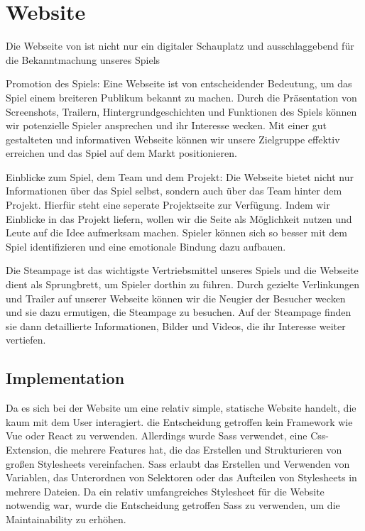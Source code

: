 
\section{Website}\label{sec:website}

\renewcommand{\kapitelautor}{Autor: Nils \& Marvin} %

%
Die Webseite von \ff ist nicht nur ein digitaler Schauplatz und ausschlaggebend für die Bekanntmachung unseres Spiels

Promotion des Spiels:
Eine Webseite ist von entscheidender Bedeutung, um das Spiel einem breiteren Publikum bekannt zu machen. Durch die Präsentation von Screenshots, Trailern,
Hintergrundgeschichten und Funktionen des Spiels können wir potenzielle Spieler ansprechen und ihr Interesse wecken. Mit einer gut gestalteten und informativen Webseite
können wir unsere Zielgruppe effektiv erreichen und das Spiel auf dem Markt positionieren.


Einblicke zum Spiel, dem Team und dem Projekt:
Die Webseite bietet nicht nur Informationen über das Spiel selbst, sondern auch über das Team hinter dem Projekt. Hierfür steht eine seperate Projektseite zur Verfügung.
Indem wir Einblicke in das Projekt liefern, wollen wir die Seite als Möglichkeit nutzen und Leute auf die Idee aufmerksam machen.
Spieler können sich so besser mit dem Spiel identifizieren und eine emotionale Bindung dazu aufbauen.

Die Steampage ist das wichtigste Vertriebsmittel unseres Spiels und die Webseite dient als Sprungbrett, um Spieler dorthin zu führen. Durch gezielte Verlinkungen und Trailer auf unserer Webseite
können wir die Neugier der Besucher wecken und sie dazu ermutigen, die Steampage zu besuchen. Auf der Steampage finden sie dann detaillierte Informationen, Bilder und Videos, die ihr Interesse weiter vertiefen.
%

\subsection{Implementation}
\renewcommand{\kapitelautor}{Autor: Marvin Kurka}

Da es sich bei der Website um eine relativ simple, statische Website handelt, die kaum mit dem User interagiert.
die Entscheidung getroffen kein Framework wie \zB Vue oder React zu verwenden.
Allerdings wurde Sass verwendet, eine Css-Extension, die mehrere Features hat, die das Erstellen und Strukturieren
von großen Stylesheets vereinfachen.
Sass erlaubt \zB das Erstellen und Verwenden von Variablen, das Unterordnen von Selektoren oder das Aufteilen von
Stylesheets in mehrere Dateien.
Da ein relativ umfangreiches Stylesheet für die Website notwendig war, wurde die Entscheidung getroffen Sass zu
verwenden, um die Maintainability zu erhöhen.

